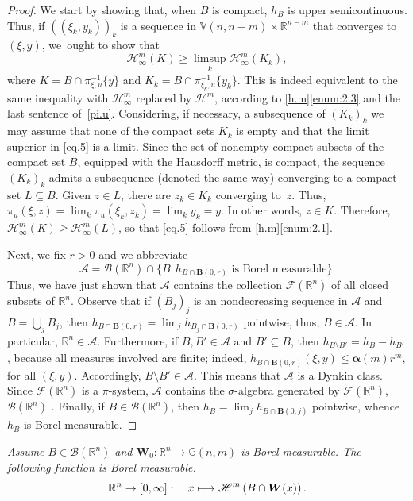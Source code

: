 \documentclass[JEP,XML,SOM,Unicode,ThmDefs,NoEqCountersInSection]{cedram}
\newcommand\mto{\mathchoice{\longmapsto}{\mapsto}{\mapsto}{\mapsto}}
\newenvironment{Empty}[2][\null]{%
\begin{enonce}[remark]{#1}#2}
{\end{enonce}}
\newcommand{\R}{\mathbb{R}}
\newcommand{\Rn}{\R^n}
\newcommand{\calA}{\mathscr{A}}
\newcommand{\calB}{\mathscr{B}}
\newcommand{\calF}{\mathscr{F}}
\newcommand{\calH}{\mathscr{H}}
\newcommand{\balpha}{\boldsymbol{\alpha}}
\newcommand{\bB}{{\boldsymbol{B}}}
\newcommand{\bW}{{\boldsymbol{W}}}
\newcommand{\bV}{\mathbb{V}}
\newcommand{\bG}{\mathbb{G}}
\let\subset\subseteq
\begin{document}
\begin{proof}
We start by showing that, when $B$ is compact, $h_{B}$ is upper semicontinuous.
Thus, if $((\xi_k,y_k))_k$ is a sequence in $\bV(n,n-m) \times \R^{n-m}$ that converges to $(\xi,y)$, we~ought to show that
\begin{equation}
\label{eq.5}
\calH^m_\infty(K) \geq \limsup_k \calH^m_\infty(K_k),
\end{equation}
where $K = B \cap \pi_{\xi,u}^{-1}\{y\}$ and $K_k = B \cap \pi_{\xi_k,u}^{-1}\{y_k\}$.
This is indeed equivalent to the same inequality with $\calH^m_\infty$ replaced by $\calH^m$, according to \ref{h.m}\eqref{enum:2.3} and the last sentence of~\ref{pi.u}.
Considering, if necessary, a subsequence of $(K_k)_k$ we may assume that none of the compact sets $K_k$ is empty and that the limit superior in \eqref{eq.5} is a limit.
Since the set of nonempty compact subsets of the compact set $B$, equipped with the Hausdorff metric, is compact, the sequence $(K_k)_k$ admits a subsequence (denoted the same way) converging to a compact set $L \subset B$.
Given $z \in L$, there are $z_k \in K_k$ converging to~$z$.
Thus, $\pi_u(\xi,z) = \lim_k \pi_u(\xi_k,z_k) = \lim_k y_k = y$.
In other words, $z \in K$.
Therefore, $\calH^m_\infty(K) \geq \calH^m_\infty(L)$, so that \eqref{eq.5} follows from \ref{h.m}\eqref{enum:2.1}.
\par
Next, we fix $r > 0$ and we abbreviate
\[
\calA = \calB(\Rn) \cap \{ B: h_{B \cap \bB(0,r)} \text{ is Borel measurable}\}.
\]
Thus, we have just shown that $\calA$ contains the collection $\calF(\Rn)$ of all closed subsets of $\Rn$.
Observe that if $(B_j)_j$ is an nondecreasing sequence in $\calA$ and $B = \bigcup_j B_j$, then $h_{B \cap \bB(0,r)} = \lim_j h_{B_j \cap \bB(0,r)}$ pointwise, thus, $B \in \calA$.
In particular, $\Rn \in \calA$.
Furthermore, if $B,B' \in \calA$ and $B' \subset B$, then $h_{B \setminus B'} = h_{B} - h_{B'}$, because all measures involved are finite; indeed, $h_{B \cap \bB(0,r)}(\xi,y) \leq \balpha(m)r^m$, for all $(\xi,y)$.
Accordingly, \hbox{$B \setminus B' \in \calA$}.
This means that $\calA$ is a Dynkin class.
Since $\calF(\Rn)$ is a $\pi$-system, $\calA$ contains the $\sigma$-algebra generated by $\calF(\Rn)$, \ie $\calB(\Rn)$ \cite[Th.\,1.6.2]{COHN}.
Finally, if $B \in \calB(\Rn)$, then $h_B = \lim_j h_{B \cap \bB(0,j)}$ pointwise, whence $h_B$ is Borel measurable.
\end{proof}

\begin{Empty}[]
\label{second.measurability}
{\it
Assume $B \in \calB(\Rn)$ and $\bW_0: \Rn \to \bG(n,m)$ is Borel measurable. The fol\-low\-ing function is Borel measurable.
\begin{equation*}
\Rn \to [0,\infty]:\quad x \mto \calH^m\left(B \cap \bW(x) \right).
\end{equation*}
}
\end{Empty}
\end{document}
